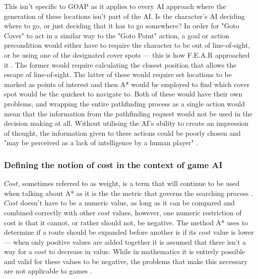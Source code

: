 \documentclass[11pt, a4paper]{article}
\begin{document}
This isn't specific to GOAP as it applies to every AI approach where the generation of these locations isn't part of the AI. Is the character's AI deciding where to go, or just deciding that it has to go somewhere? In order for "Goto Cover" to act in a similar way to the "Goto Point" action, a goal or action precondition would either have to require the character to be out of line-of-sight, or be using one of the designated cover spots --- this is how F.E.A.R \parencite*{FEAR} approached it \parencite[12]{orkin2006three}. The former would require calculating the closest position that allows the escape of line-of-sight. The latter of these would require set locations to be marked as points of interest and then A* would be employed to find which cover spot would be the quickest to navigate to. Both of these would have their own problems, and wrapping the entire pathfinding process as a single action would mean that the information from the pathfinding request would not be used in the decision making at all. Without utilising the AI's ability to create an impression of thought, the information given to these actions could be poorly chosen and "may be perceived as a lack of intelligence by a human player" \parencite[63]{graham2003pathfinding}.

\subsubsection{Defining the notion of cost in the context of game AI}

$Cost$, sometimes referred to as weight, is a term that will continue to be used when talking about A* as it is the the metric that governs the searching process \parencite[60]{graham2003pathfinding}. $Cost$ doesn't have to be a numeric value, as long as it can be compared and combined correctly with other $cost$ values, however, one numeric restriction of cost is that it cannot, or rather should not, be negative. The method A* uses to determine if a route should be expanded before another is if its $cost$ value is lower --- when only positive values are added together it is assumed that there isn't a way for a $cost$ to decrease in value. While in mathematics it is entirely possible and valid for these values to be negative, the problems that make this necessary are not applicable to games \parencite[202]{millington2019ai}.
\end{document}
